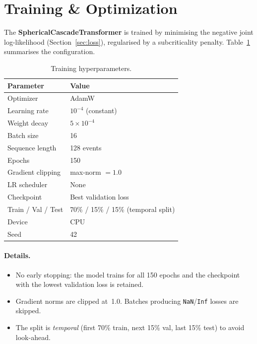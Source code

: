\documentclass[11pt,a4paper]{article}
\begin{document}
\section{Training \& Optimization}\label{sec:training}

The \textbf{SphericalCascadeTransformer} is trained by minimising
the negative joint log-likelihood (Section~\ref{sec:loss}),
regularised by a subcriticality penalty.
Table~\ref{tab:training} summarises the configuration.

\begin{table}[h]
\centering
\caption{Training hyperparameters.}\label{tab:training}
\begin{tabular}{@{}ll@{}}
\toprule
\textbf{Parameter} & \textbf{Value} \\
\midrule
Optimizer           & AdamW \cite{loshchilov2019decoupled}  \\
Learning rate       & $10^{-4}$ (constant)                  \\
Weight decay        & $5 \times 10^{-4}$                    \\
Batch size          & 16                                    \\
Sequence length     & 128 events                            \\
Epochs              & 150                                   \\
Gradient clipping   & max-norm $= 1.0$                      \\
LR scheduler        & None                                  \\
Checkpoint          & Best validation loss                  \\
Train / Val / Test  & 70\% / 15\% / 15\% (temporal split)   \\
Device              & CPU                                   \\
Seed                & 42                                    \\
\bottomrule
\end{tabular}
\end{table}

\paragraph{Details.}
\begin{itemize}[nosep]
  \item No early stopping: the model trains for all 150 epochs and the
        checkpoint with the lowest validation loss is retained.
  \item Gradient norms are clipped at~1.0.  Batches producing
        \texttt{NaN}/\texttt{Inf} losses are skipped.
  \item The split is \emph{temporal} (first 70\% train, next 15\% val,
        last 15\% test) to avoid look-ahead.
\end{itemize}
\end{document}

